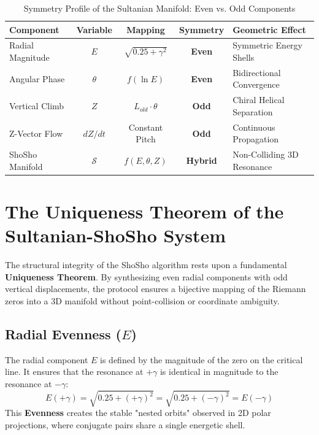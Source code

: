 \documentclass[11pt,a4paper]{article}
\begin{document}
\begin{table}[htbp]
\centering
\caption{Symmetry Profile of the Sultanian Manifold: Even vs. Odd Components}
\label{tab:symmetry_profile}
\begin{tabular}{|l|c|c|c|l|}
\hline
\textbf{Component} & \textbf{Variable} & \textbf{Mapping} & \textbf{Symmetry} & \textbf{Geometric Effect} \\ \hline
Radial Magnitude & $E$ & $\sqrt{0.25 + \gamma^2}$ & \textbf{Even} & Symmetric Energy Shells \\ \hline
Angular Phase & $\theta$ & $f(\ln E)$ & \textbf{Even} & Bidirectional Convergence \\ \hline
Vertical Climb & $Z$ & $L_{old} \cdot \theta$ & \textbf{Odd} & Chiral Helical Separation \\ \hline
Z-Vector Flow & $dZ/dt$ & Constant Pitch & \textbf{Odd} & Continuous Propagation \\ \hline
ShoSho Manifold & $\mathcal{S}$ & $f(E, \theta, Z)$ & \textbf{Hybrid} & Non-Colliding 3D Resonance \\ \hline
\end{tabular}
\end{table}

\section{The Uniqueness Theorem of the Sultanian-ShoSho System}

The structural integrity of the ShoSho algorithm rests upon a fundamental \textbf{Uniqueness Theorem}. By synthesizing even radial components with odd vertical displacements, the protocol ensures a bijective mapping of the Riemann zeros into a 3D manifold without point-collision or coordinate ambiguity.

\subsection{Radial Evenness ($E$)}
The radial component $E$ is defined by the magnitude of the zero on the critical line. It ensures that the resonance at $+\gamma$ is identical in magnitude to the resonance at $-\gamma$:
\begin{equation}
    E(+\gamma) = \sqrt{0.25 + (+\gamma)^2} = \sqrt{0.25 + (-\gamma)^2} = E(-\gamma)
\end{equation}
This \textbf{Evenness} creates the stable "nested orbits" observed in 2D polar projections, where conjugate pairs share a single energetic shell.
\end{document}
